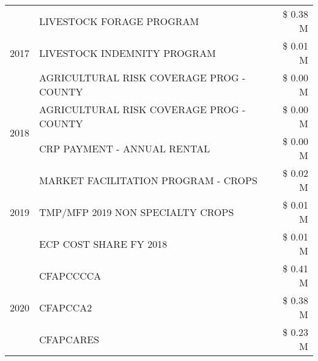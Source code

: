 \begin{tabular}{llr}
\cline{1-3}
\multirow[t]{3}{*}{2017} & LIVESTOCK FORAGE PROGRAM & \$ 0.38 M \\
 & LIVESTOCK INDEMNITY PROGRAM & \$ 0.01 M \\
 & AGRICULTURAL RISK COVERAGE PROG - COUNTY & \$ 0.00 M \\
\cline{1-3}
\multirow[t]{2}{*}{2018} & AGRICULTURAL RISK COVERAGE PROG - COUNTY & \$ 0.00 M \\
 & CRP PAYMENT - ANNUAL RENTAL & \$ 0.00 M \\
\cline{1-3}
\multirow[t]{3}{*}{2019} & MARKET FACILITATION PROGRAM - CROPS & \$ 0.02 M \\
 & TMP/MFP 2019 NON SPECIALTY CROPS & \$ 0.01 M \\
 & ECP COST SHARE FY 2018 & \$ 0.01 M \\
\cline{1-3}
\multirow[t]{3}{*}{2020} & CFAPCCCCA & \$ 0.41 M \\
 & CFAPCCA2 & \$ 0.38 M \\
 & CFAPCARES & \$ 0.23 M \\
\cline{1-3}
\bottomrule
\end{tabular}
